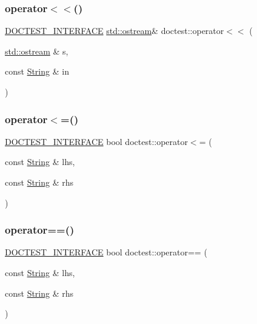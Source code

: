 \mbox{\label{namespacedoctest_a44abf00f713df05b4185eda7403268b7}} 
\subsubsection{\texorpdfstring{operator$<$$<$()}{operator<<()}}
{\footnotesize\ttfamily \mbox{\hyperlink{doctest_8h_a9c16ffc635ec47f07797d21ede26b1a5}{D\+O\+C\+T\+E\+S\+T\+\_\+\+I\+N\+T\+E\+R\+F\+A\+CE}} \mbox{\hyperlink{doctest_8h_a116af65cb5e924b33ad9d9ecd7a783f3}{std\+::ostream}}\& doctest\+::operator$<$$<$ (\begin{DoxyParamCaption}\item[{\mbox{\hyperlink{doctest_8h_a116af65cb5e924b33ad9d9ecd7a783f3}{std\+::ostream}} \&}]{s,  }\item[{const \mbox{\hyperlink{classdoctest_1_1_string}{String}} \&}]{in }\end{DoxyParamCaption})}

\mbox{\label{namespacedoctest_a27c6c308e814ad9384499bafc03f9e39}} 
\subsubsection{\texorpdfstring{operator$<$=()}{operator<=()}}
{\footnotesize\ttfamily \mbox{\hyperlink{doctest_8h_a9c16ffc635ec47f07797d21ede26b1a5}{D\+O\+C\+T\+E\+S\+T\+\_\+\+I\+N\+T\+E\+R\+F\+A\+CE}} bool doctest\+::operator$<$= (\begin{DoxyParamCaption}\item[{const \mbox{\hyperlink{classdoctest_1_1_string}{String}} \&}]{lhs,  }\item[{const \mbox{\hyperlink{classdoctest_1_1_string}{String}} \&}]{rhs }\end{DoxyParamCaption})}

\mbox{\label{namespacedoctest_ae332e5e775f83a532884303780f79f9f}} 
\subsubsection{\texorpdfstring{operator==()}{operator==()}}
{\footnotesize\ttfamily \mbox{\hyperlink{doctest_8h_a9c16ffc635ec47f07797d21ede26b1a5}{D\+O\+C\+T\+E\+S\+T\+\_\+\+I\+N\+T\+E\+R\+F\+A\+CE}} bool doctest\+::operator== (\begin{DoxyParamCaption}\item[{const \mbox{\hyperlink{classdoctest_1_1_string}{String}} \&}]{lhs,  }\item[{const \mbox{\hyperlink{classdoctest_1_1_string}{String}} \&}]{rhs }\end{DoxyParamCaption})}

